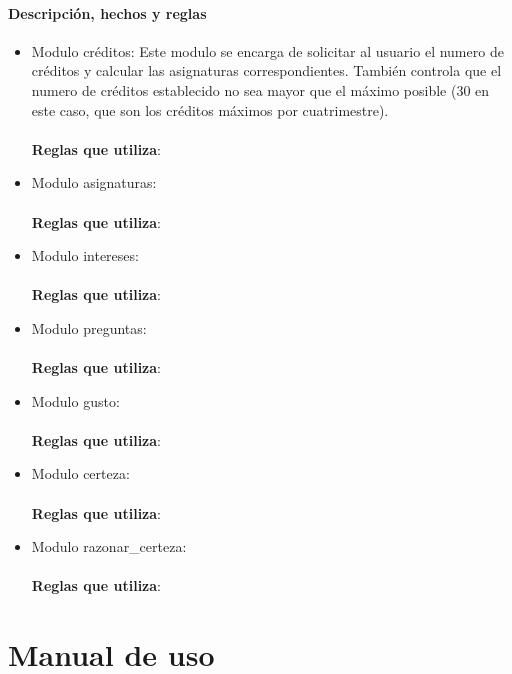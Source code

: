 \subsubsection{Descripción, hechos y reglas}
\begin{itemize}
   \item Modulo créditos: Este modulo se encarga de solicitar al usuario el numero de créditos y calcular las asignaturas correspondientes. También controla que el numero de créditos establecido no sea mayor que el máximo posible (30 en este caso, que son los créditos máximos por cuatrimestre).
   \\\\
   \textbf{Reglas que utiliza}:

   \item Modulo asignaturas:
   \\\\
   \textbf{Reglas que utiliza}:

   \item Modulo intereses:
   \\\\
   \textbf{Reglas que utiliza}:

   \item Modulo preguntas:
   \\\\
   \textbf{Reglas que utiliza}:

   \item Modulo gusto:
   \\\\
   \textbf{Reglas que utiliza}:

   \item Modulo certeza:
   \\\\
   \textbf{Reglas que utiliza}:

   \item Modulo razonar\_certeza:
   \\\\
   \textbf{Reglas que utiliza}:


\end{itemize}



\chapter{Manual de uso}
